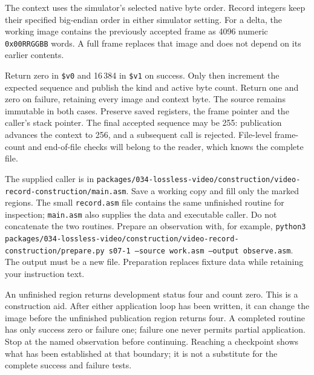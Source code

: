 The context uses the simulator's selected native byte order. Record integers keep
their specified big-endian order in either simulator setting. For a delta, the
working image contains the previously accepted frame as 4096 numeric
\texttt{0x00RRGGBB} words. A full frame replaces that image and does not depend on
its earlier contents.

Return zero in \texttt{\$v0} and 16\,384 in \texttt{\$v1} on success. Only then
increment the expected sequence and publish the kind and active byte count. Return
one and zero on failure, retaining every image and context byte. The source remains
immutable in both cases. Preserve saved registers, the frame pointer and the
caller's stack pointer. The final accepted sequence may be 255: publication advances
the context to 256, and a subsequent call is rejected. File-level frame-count and
end-of-file checks will belong to the reader, which knows the complete file.

The supplied caller is in \texttt{packages/034-lossless-video/construction/video-record-construction/main.asm}. Save
a working copy and fill only the marked regions. The small
\texttt{record.asm} file contains the same unfinished routine for inspection;
\texttt{main.asm} also supplies the data and executable caller. Do not concatenate
the two routines. Prepare an observation with, for example,
\texttt{python3 packages/034-lossless-video/construction/video-record-construction/prepare.py s07-1 --source work.asm
  --output observe.asm}. The output must be a new file. Preparation replaces fixture
data while retaining your instruction text.

An unfinished region returns development status four and count zero. This is a
construction aid. After either application loop has been written, it can change the
image before the unfinished publication region returns four. A completed routine
has only success zero or failure one; failure one never permits partial application.
Stop at the named observation before continuing. Reaching a checkpoint shows what
has been established at that boundary; it is not a substitute for the complete
success and failure tests.
